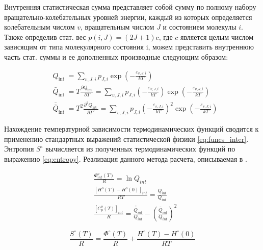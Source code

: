 \documentclass[12pt]{extarticle}
\begin{document}
    Внутренняя статистическая сумма представляет собой сумму по полному набору вращательно-колебательных уровней энергии, каждый из которых определяется колебательным числом $v$, вращательным числом $J$ и состоянием молекулы $i$. Также определив стат. вес  $p(i, J) = (2J+1)c$, где $c$ является целым числом зависящим от типа молекулярного состояния i, можем представить внутреннюю часть стат. суммы и ее дополненных производные следующим образом:
    
        \begin{equation}\label{q_inter}
    	\begin{split}
		& Q_{\text {int }}=\sum_{v, J, i} p_{J, i} \exp \left(-\frac{\varepsilon_{v, J, i}}{k T}\right) \\
		& \bar{Q}_{\text {int }}=T \frac{\partial Q_{\text {int }}}{\partial T}=\sum_{v, J, i} p_{J, i}\left(-\frac{\varepsilon_{v, J, i}}{k T}\right) \exp \left(-\frac{\varepsilon_{v, J, i}}{k T}\right) \\
		& \bar{\bar{Q}}_{\text {int }}=T^2 \frac{\partial^2 Q_{\text {int }}}{\partial T^2}=\sum_{v, J, i} p_{J, i}\left(-\frac{\varepsilon_{v, J, i}}{k T}\right)^2 \exp \left(-\frac{\varepsilon_{v, J, i}}{k T}\right)
    	\end{split}
    \end{equation}
    
    Нахождение температурной зависимости термодинамических функций сводится к применению стандартных выражений статистической физики \ref{eq:funcs_inter}. Энтропия $S^\circ$ вычисляется из полученных термодинамических функций по выражению \ref{eq:entropy}. Реализация данного метода расчета, описываемая в \cite{gurvich1989thermodynamic}.
    
    \begin{equation}\label{eq:funcs_inter}
    	\begin{split}
		&\frac{\Phi_{i n t}^o(T)}{R}=\ln Q_{i n t} \\
		&\frac{\left[H^o(T)-H^o(0)\right]_{i n t}}{R T}=\frac{\bar{Q}_{i n t}}{Q_{i n t}} \\
		&\frac{\left[C_p^o(T)\right]_{i n t}}{R}=\frac{\bar{\bar{Q}}_{i n t}}{Q_{i n t}}-\left(\frac{\bar{Q}_{i n t}}{Q_{i n t}}\right)^2
    	\end{split}
    \end{equation}
	
	\begin{equation} \label{eq:entropy}
		\frac{S^{\circ}(T)}{R}=\frac{\Phi^{\circ}(T)}{R}+\frac{H^{\circ}(T)-H^{\circ}(0)}{R T}
	\end{equation}
	
\end{document}
